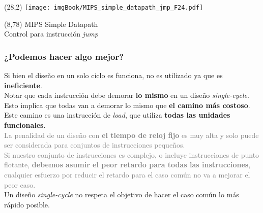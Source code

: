 \documentclass[aspectratio=169]{beamer}
\begin{document}
\begin{frame}[t,fragile]
    \begin{textblock}{80}(28,2)
    \texttt{[image: imgBook/MIPS\_simple\_datapath\_jmp\_F24.pdf]}
    \end{textblock}
    \begin{textblock}{80}(8,78)
    \textcolor{naranjauca}{\Large MIPS Simple Datapath\\ \normalsize Control para instrucción \emph{jump}}
    \end{textblock}
\end{frame}

\begin{frame}[t,fragile]
    \frametitle{¿Podemos hacer algo mejor?}
    Si bien el diseño en un solo ciclo es funciona, no es utilizado ya que es \textbf{ineficiente}.\\
    \bigskip
    \pause
    \textcolor{verdeuca}{Notar que cada instrucción debe demorar \textbf{lo mismo} en un diseño \emph{single-cycle}.}\\
    \textcolor{rojo}{Esto implica que todas van a demorar lo mismo que \textbf{el camino más costoso}.}\\
    Este camino es una instrucción de \emph{load}, que utiliza \textbf{todas las unidades funcionales}.\\
    \pause
    \bigskip
    \textcolor{gray}{La penalidad de un diseño con \textbf{el tiempo de reloj fijo} es muy alta y solo puede ser considerada para conjuntos de instrucciones pequeños.}\\
    \bigskip
    \pause
    \textcolor{gray}{Si nuestro conjunto de instrucciones es complejo, o incluye instrucciones de punto flotante, \textbf{debemos asumir el peor retardo para todas las instrucciones},
    cualquier esfuerzo por reducir el retardo para el caso común no va a mejorar el peor caso.}\\
    \bigskip
    Un diseño \emph{single-cycle} no respeta el objetivo de hacer el caso común lo más rápido posible.
\end{frame}

\end{document}
